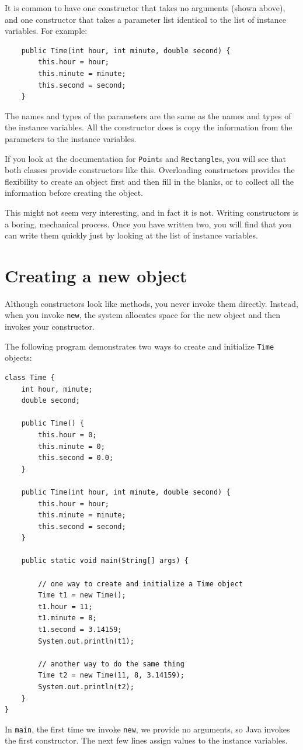 \documentclass[12pt]{book}
\theoremstyle{exercise}
\begin{document}
It is common to have one constructor that takes no
arguments (shown above), and one constructor that takes
a parameter list identical to the list of instance
variables.  For example:

\begin{lstlisting}
    public Time(int hour, int minute, double second) {
        this.hour = hour;
        this.minute = minute;
        this.second = second;
    }
\end{lstlisting}
%
The names and types of the parameters are the same as
the names and types of the instance variables.  All the
constructor does is copy the information from the parameters
to the instance variables.

If you look at the documentation for {\tt Point}s
and {\tt Rectangle}s, you will see that both classes provide
constructors like this.  Overloading constructors provides the
flexibility to create an object first and then fill in the
blanks, or to collect all the information before creating
the object.

This might not seem very interesting, and in fact it
is not.  Writing constructors is a boring, mechanical process.
Once you have written two, you will find that you can write them
quickly just by looking at the list of instance
variables.


\section{Creating a new object}

Although constructors look like methods, you never invoke them
directly.  Instead, when you invoke {\tt new}, the system
allocates space for the new object and then
invokes your constructor.

The following program demonstrates two ways to create and
initialize {\tt Time} objects:

\begin{lstlisting}
class Time {
    int hour, minute;
    double second;

    public Time() {
        this.hour = 0;
        this.minute = 0;
        this.second = 0.0;
    }

    public Time(int hour, int minute, double second) {
        this.hour = hour;
        this.minute = minute;
        this.second = second;
    }

    public static void main(String[] args) {

        // one way to create and initialize a Time object
        Time t1 = new Time();
        t1.hour = 11;
        t1.minute = 8;
        t1.second = 3.14159;
        System.out.println(t1);

        // another way to do the same thing
        Time t2 = new Time(11, 8, 3.14159);
        System.out.println(t2);
    }
}
\end{lstlisting}
%
In {\tt main}, the first time we invoke {\tt new},
we provide no arguments, so Java invokes the first constructor.
The next few lines assign values to the instance
variables.
\end{document}

